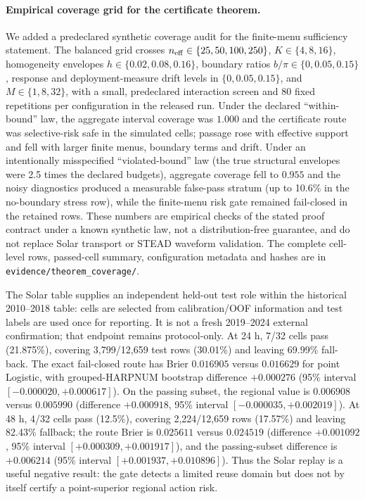 \documentclass[11pt,a4paper]{article}
\numberwithin{equation}{section}
\theoremstyle{definition}\newtheorem{definition}[theorem]{Definition}
\theoremstyle{remark}\newtheorem{remark}[theorem]{Remark}
\begin{document}
\paragraph{Empirical coverage grid for the certificate theorem.}
We added a predeclared synthetic coverage audit for the finite-menu sufficiency
statement. The balanced grid crosses $n_{\rm eff}\in\{25,50,100,250\}$,
$K\in\{4,8,16\}$, homogeneity envelopes
$h\in\{0.02,0.08,0.16\}$, boundary ratios $b/\pi\in\{0,0.05,0.15\}$,
response and deployment-measure drift levels in $\{0,0.05,0.15\}$, and
$M\in\{1,8,32\}$, with a small, predeclared interaction screen and 80
fixed repetitions per configuration in the released run. Under the declared
``within-bound'' law, the aggregate interval coverage was $1.000$ and the
certificate route was selective-risk safe in the simulated cells; passage
rose with effective support and fell with larger finite menus, boundary terms
and drift. Under an intentionally misspecified ``violated-bound'' law (the
true structural envelopes were 2.5 times the declared budgets), aggregate
coverage fell to $0.955$ and the noisy diagnostics produced a measurable
false-pass stratum (up to 10.6\% in the no-boundary stress row), while the
finite-menu risk gate remained fail-closed in the retained rows. These numbers
are empirical checks of the stated proof contract under a known synthetic law,
not a distribution-free guarantee, and do not replace Solar transport or
STEAD waveform validation. The complete cell-level rows, passed-cell summary,
configuration metadata and hashes are in
\texttt{evidence/theorem\_coverage/}.

The Solar table supplies an independent held-out test role within the historical
2010--2018 table: cells are selected from calibration/OOF information and test
labels are used once for reporting. It is not a fresh 2019--2024 external
confirmation; that endpoint remains protocol-only. At 24 h, 7/32 cells pass
(21.875\%), covering 3,799/12,659 test rows (30.01\%) and leaving 69.99\%
fall-back. The exact fail-closed route has Brier $0.016905$ versus $0.016629$ for
point Logistic, with grouped-HARPNUM bootstrap difference $+0.000276$
(95\% interval $[-0.000020,+0.000617]$). On the passing subset, the regional
value is $0.006908$ versus $0.005990$ (difference $+0.000918$,
95\% interval $[-0.000035,+0.002019]$). At 48 h, 4/32 cells pass (12.5\%),
covering 2,224/12,659 rows (17.57\%) and leaving 82.43\% fallback; the route
Brier is $0.025611$ versus $0.024519$ (difference $+0.001092$,
95\% interval $[+0.000309,+0.001917]$), and the passing-subset difference is
$+0.006214$ (95\% interval $[+0.001937,+0.010896]$). Thus the Solar replay
is a useful negative result: the gate detects a limited reuse domain but does
not by itself certify a point-superior regional action risk.
\end{document}
